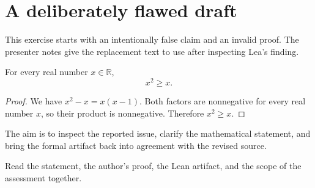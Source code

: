 \section{A deliberately flawed draft}

This exercise starts with an intentionally false claim and an invalid proof.
The presenter notes give the replacement text to use after inspecting
Lea's finding.

\begin{theorem}\label{thm:demo-square-bound}
For every real number $x\in\mathbb{R}$,
\[
  x^2\ge x.
\]
\end{theorem}
\begin{proof}
We have $x^2-x=x(x-1)$. Both factors are nonnegative for every real
number $x$, so their product is nonnegative. Therefore $x^2\ge x$.
\end{proof}

The aim is to inspect the reported issue, clarify the mathematical
statement, and bring the formal artifact back into agreement with the
revised source.

\vfill
{\small\color{leagreen}Read the statement, the author's proof, the Lean
artifact, and the scope of the assessment together.}
